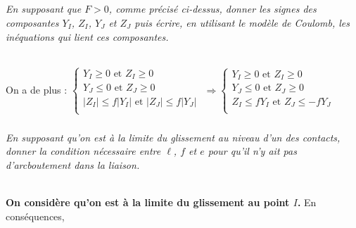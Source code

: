\documentclass[10pt,fleqn]{article} %
\begin{document}
\begin{multicols}{2}
%
%
%

\else
\fi


\subparagraph{}\textit{En supposant que $F > 0$, comme précisé ci-dessus, donner  les signes des composantes  $Y_I$, $Z_I$, $Y_J$ et $Z_J$ puis écrire,  en utilisant  le modèle  de Coulomb, les inéquations  qui lient ces composantes.}
\ifprof
\begin{corrige} ~\\
On a de plus : 
$
\left\{
\begin{array}{l}
Y_I \geq 0 \text{ et } Z_I \geq 0 \\
Y_J \leq 0 \text{ et } Z_J \geq 0 \\
|Z_I|\leq f|Y_I| \text{ et }  |Z_J|\leq f|Y_J| \\
\end{array}
\right.$
$ \Rightarrow 
\left\{
\begin{array}{l}
Y_I \geq 0 \text{ et } Z_I \geq 0 \\
Y_J \leq 0 \text{ et } Z_J \geq 0 \\
Z_I\leq fY_I \text{ et }  Z_J\leq -fY_J \\
\end{array}
\right.$


\end{corrige}
\else
\fi

\subparagraph{}\textit{En supposant qu’on est à  la limite du glissement au niveau d’un des contacts, donner la condition nécessaire entre $\ell$, $f$ et $e$ pour qu’il n’y ait pas d’arcboutement dans la liaison.}

\ifprof
\begin{corrige}~\\

\textbf{On considère qu'on est à la limite du glissement au point $I$.}
  En conséquences, 


\end{corrige}
\end{multicols}
\end{document}
